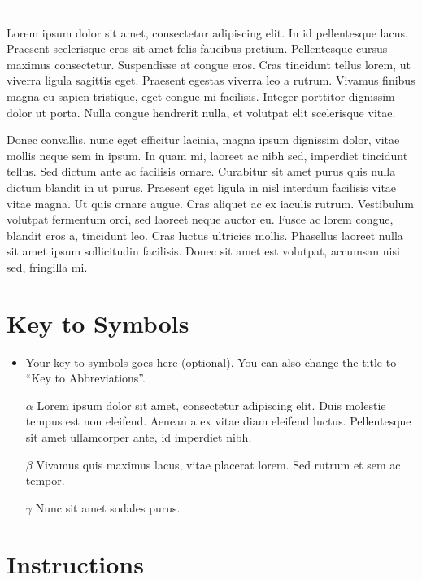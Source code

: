 \documentclass[dissertation]{msudissertation}
\begin{document}
---

Lorem ipsum dolor sit amet, consectetur adipiscing elit. In id pellentesque lacus. Praesent scelerisque eros sit amet felis faucibus pretium. Pellentesque cursus maximus consectetur. Suspendisse at congue eros. Cras tincidunt tellus lorem, ut viverra ligula sagittis eget. Praesent egestas viverra leo a rutrum. Vivamus finibus magna eu sapien tristique, eget congue mi facilisis. Integer porttitor dignissim dolor ut porta. Nulla congue hendrerit nulla, et volutpat elit scelerisque vitae.

Donec convallis, nunc eget efficitur lacinia, magna ipsum dignissim dolor, vitae mollis neque sem in ipsum. In quam mi, laoreet ac nibh sed, imperdiet tincidunt tellus. Sed dictum ante ac facilisis ornare. Curabitur sit amet purus quis nulla dictum blandit in ut purus. Praesent eget ligula in nisl interdum facilisis vitae vitae magna. Ut quis ornare augue. Cras aliquet ac ex iaculis rutrum. Vestibulum volutpat fermentum orci, sed laoreet neque auctor eu. Fusce ac lorem congue, blandit eros a, tincidunt leo. Cras luctus ultricies mollis. Phasellus laoreet nulla sit amet ipsum sollicitudin facilisis. Donec sit amet est volutpat, accumsan nisi sed, fringilla mi.

\tableofcontents
\listoftables
\listoffigures

\chapter{Key to Symbols}

\begin{itemize}
\item Your key to symbols goes here (optional).  You can also change the title to ``Key to Abbreviations''.
\item[$\alpha$] Lorem ipsum dolor sit amet, consectetur adipiscing elit. Duis molestie tempus est non eleifend. Aenean a ex vitae diam eleifend luctus. Pellentesque sit amet ullamcorper ante, id imperdiet nibh.
\item[$\beta$] Vivamus quis maximus lacus, vitae placerat lorem. Sed rutrum et sem ac tempor.
\item[$\gamma$] Nunc sit amet sodales purus.
\end{itemize}

\mainmatter

\chapter{Instructions}
\label{chapter:instructions}
\end{document}
